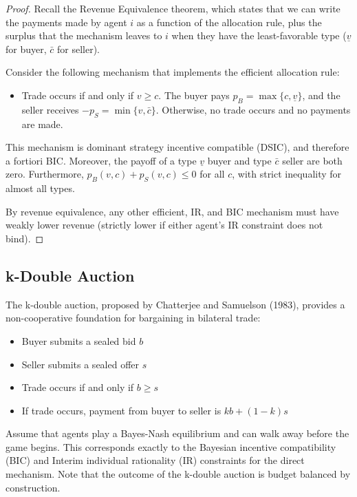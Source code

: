 \documentclass[11pt]{elegantbook_2}
\begin{document}
\begin{proof}
    Recall the Revenue Equivalence theorem, which states that we can write the payments made by agent $i$ as a function of the allocation rule, plus the surplus that the mechanism leaves to $i$ when they have the least-favorable type ($\underline{v}$ for buyer, $\bar{c}$ for seller).
    
    Consider the following mechanism that implements the efficient allocation rule:
    \begin{itemize}
        \item Trade occurs if and only if $v\geq c$. The buyer pays $p_B=\max\{c,\underline{v}\}$, and the seller receives $-p_S=\min\{v,\bar{c}\}$. Otherwise, no trade occurs and no payments are made.
    \end{itemize}
    
    This mechanism is dominant strategy incentive compatible (DSIC), and therefore a fortiori BIC. Moreover, the payoff of a type $\underline{v}$ buyer and type $\bar{c}$ seller are both zero. Furthermore, $p_B(v,c)+p_S(v,c)\leq 0$ for all $c$, with strict inequality for almost all types.
    
    By revenue equivalence, any other efficient, IR, and BIC mechanism must have weakly lower revenue (strictly lower if either agent's IR constraint does not bind).
\end{proof}






\subsection{k-Double Auction}
The k-double auction, proposed by Chatterjee and Samuelson (1983), provides a non-cooperative foundation for bargaining in bilateral trade:

\begin{itemize}
    \item Buyer submits a sealed bid $b$
    \item Seller submits a sealed offer $s$ 
    \item Trade occurs if and only if $b \geq s$
    \item If trade occurs, payment from buyer to seller is $kb + (1-k)s$
\end{itemize}

Assume that agents play a Bayes-Nash equilibrium and can walk away before the game begins. This corresponds exactly to the Bayesian incentive compatibility (BIC) and Interim individual rationality (IR) constraints for the direct mechanism. Note that the outcome of the k-double auction is budget balanced by construction.
\end{document}
